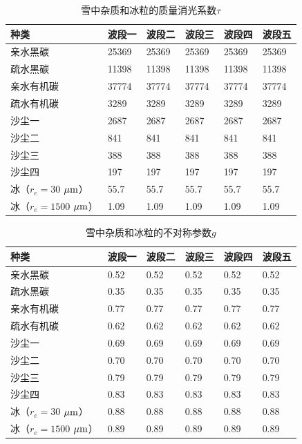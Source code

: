 \begin{table}[htbp]
\centering
\caption{雪中杂质和冰粒的质量消光系数$\tau$}
\label{tab:积雪消光系数}
\begin{tabular}{llllll}
\toprule
种类 & 波段一 & 波段二 & 波段三 & 波段四 & 波段五 \\ \midrule
亲水黑碳 & 25369 & 25369 & 25369 & 25369 & 25369 \\
疏水黑碳 & 11398 & 11398 & 11398 & 11398 & 11398 \\
亲水有机碳 & 37774 & 37774 & 37774 & 37774 & 37774 \\
疏水有机碳 & 3289 & 3289 & 3289 & 3289 & 3289 \\
沙尘一 & 2687 & 2687 & 2687 & 2687 & 2687 \\
沙尘二 & 841 & 841 & 841 & 841 & 841 \\
沙尘三 & 388 & 388 & 388 & 388 & 388 \\
沙尘四 & 197 & 197 & 197 & 197 & 197 \\
冰（$r_{e}=30$ $\mu\rm{m}$） & 55.7 & 55.7 & 55.7 & 55.7 & 55.7 \\
冰（$r_{e}=1500$ $\mu\rm{m}$） & 1.09 & 1.09 & 1.09 & 1.09 & 1.09 \\ \bottomrule
\end{tabular}
\end{table}

\begin{table}[htbp]
\centering
\caption{雪中杂质和冰粒的不对称参数$g$}
\label{tab:积雪不对称参数}
\begin{tabular}{llllll}
\toprule
种类 & 波段一 & 波段二 & 波段三 & 波段四 & 波段五 \\ \midrule
亲水黑碳 & 0.52 & 0.52 & 0.52 & 0.52 & 0.52 \\
疏水黑碳 & 0.35 & 0.35 & 0.35 & 0.35 & 0.35 \\
亲水有机碳 & 0.77 & 0.77 & 0.77 & 0.77 & 0.77 \\
疏水有机碳 & 0.62 & 0.62 & 0.62 & 0.62 & 0.62 \\
沙尘一 & 0.69 & 0.69 & 0.69 & 0.69 & 0.69 \\
沙尘二 & 0.70 & 0.70 & 0.70 & 0.70 & 0.70 \\
沙尘三 & 0.79 & 0.79 & 0.79 & 0.79 & 0.79 \\
沙尘四 & 0.83 & 0.83 & 0.83 & 0.83 & 0.83 \\
冰（$r_{e}=30$ $\mu\rm{m}$） & 0.88 & 0.88 & 0.88 & 0.88 & 0.88 \\
冰（$r_{e}=1500$ $\mu\rm{m}$） & 0.89 & 0.89 & 0.89 & 0.89 & 0.89\\ \bottomrule
\end{tabular}
\end{table}

